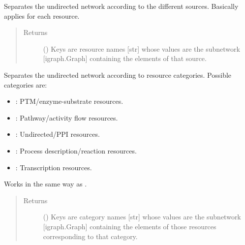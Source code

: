 \documentclass[letterpaper,10pt,english]{sphinxmanual}
\begin{document}
\begin{fulllineitems}
\begin{fulllineitems}
\label{\detokenize{reference:pypath.main.PyPath.separate}}
Separates the undirected network according to the different
sources. Basically applies
{\hyperref[\detokenize{reference:pypath.main.PyPath.get_network}]{}} for each resource.
\begin{quote}\begin{description}
\item[{Returns}] \leavevmode
() \textendash{} Keys are resource names {[}str{]} whose values are
the subnetwork {[}igraph.Graph{]} containing the elements of
that source.

\end{description}\end{quote}

\end{fulllineitems}


\begin{fulllineitems}
\label{\detokenize{reference:pypath.main.PyPath.separate_by_category}}
Separates the undirected network according to resource
categories. Possible categories are:
\begin{itemize}
\item {} 
: PTM/enzyme-substrate resources.

\item {} 
: Pathway/activity flow resources.

\item {} 
: Undirected/PPI resources.

\item {} 
: Process description/reaction resources.

\item {} 
: Transcription resources.

\end{itemize}

Works in the same way as {\hyperref[\detokenize{reference:pypath.main.PyPath.separate}]{}}.
\begin{quote}\begin{description}
\item[{Returns}] \leavevmode
() \textendash{} Keys are category names {[}str{]} whose values are
the subnetwork {[}igraph.Graph{]} containing the elements of
those resources corresponding to that category.


\end{description}
\end{quote}
\end{fulllineitems}
\end{fulllineitems}
\end{document}
